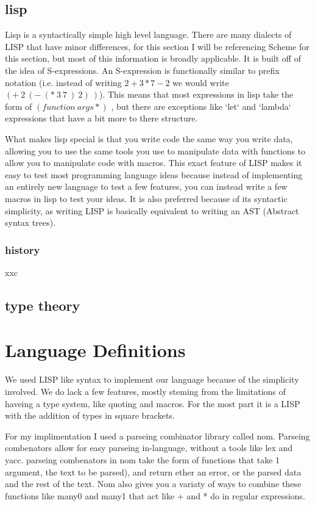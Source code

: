 \documentclass[12pt]{report}
\begin{document}
\section{lisp}
\begin{paragraph}
  Lisp is a syntactically simple high level language. There are many dialects of LISP that have minor differences, for this section I will be referencing Scheme\cite{r7rs} for this section, but most of this information is broadly applicable. It is built off of the idea of S-expressions.\cite{OGLISPpaper} An S-expression is functionally similar to prefix notation (i.e. instead of writing $2+3*7-2$ we would write $(+\ 2\ (-\ (*\ 3\ 7\ )\ 2)\ )$). This means that most expressions in lisp take the form of $(function\ args*)$ , but there are exceptions like `let` and `lambda` expressions that have a bit more to there structure.

  What makes lisp special is that you write code the same way you write data, allowing you to use the same tools you use to manipulate data with functions to allow you to manipulate code with macros. This exact feature of LISP makes it easy to test most programming language ideas because instead of implementing an entirely new language to test a few features, you can instead write a few macros in lisp to test your ideas. It is also preferred because of its syntactic simplicity, as writing LISP is basically equivalent to writing an AST (Abstract syntax trees). %

\end{paragraph}
\subsection{history}
\begin{paragraph}
  \qquad xxc
\end{paragraph}
\section{type theory}

\chapter{Language Definitions}
\begin{paragraph}
  We used LISP like syntax to implement our language because of the simplicity involved. We do lack a few features, mostly steming from the limitations of haveing a type system, like quoting and macros. For the most part it is a LISP with the addition of types in square brackets.

  For my implimentation I used a parseing combinator library called nom\cite{nom}. Parseing combenators \cite{Leijen2001ParsecDS} allow for easy parseing in-language, without a tools like lex and yacc\cite{lexandyacc}. parseing combenators in nom take the form of functions that take 1 argument, the text to be parsed), and return ether an error, or the parsed data and the rest of the text. Nom also gives you a variaty of ways to  combine these functions like many0 and many1 that act like + and * do in regular expressions.
\end{paragraph}
\end{document}
